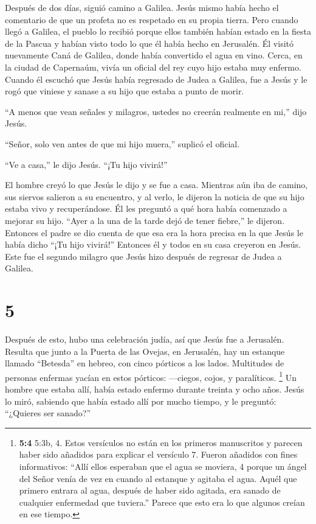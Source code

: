  Después de dos días, siguió camino a Galilea.
 Jesús mismo había hecho el comentario de que un profeta no
es respetado en su propia tierra.  Pero cuando llegó a
Galilea, el pueblo lo recibió porque ellos también habían estado en la
fiesta de la Pascua y habían visto todo lo que él había hecho en
Jerusalén.  Él visitó nuevamente Caná de Galilea, donde
había convertido el agua en vino. Cerca, en la ciudad de Capernaúm,
vivía un oficial del rey cuyo hijo estaba muy enfermo. 
Cuando él escuchó que Jesús había regresado de Judea a Galilea, fue a
Jesús y le rogó que viniese y sanase a su hijo que estaba a punto de
morir.

 ``A menos que vean señales y milagros, ustedes no creerán
realmente en mi,'' dijo Jesús.

 ``Señor, solo ven antes de que mi hijo muera,'' suplicó el
oficial.

 ``Ve a casa,'' le dijo Jesús. ``¡Tu hijo vivirá!''

El hombre creyó lo que Jesús le dijo y se fue a casa. 
Mientras aún iba de camino, sus siervos salieron a su encuentro, y al
verlo, le dijeron la noticia de que su hijo estaba vivo y recuperándose.
 Él les preguntó a qué hora había comenzado a mejorar su
hijo. ``Ayer a la una de la tarde dejó de tener fiebre,'' le dijeron.
 Entonces el padre se dio cuenta de que esa era la hora
precisa en la que Jesús le había dicho ``¡Tu hijo vivirá!'' Entonces él
y todos en su casa creyeron en Jesús.  Este fue el segundo
milagro que Jesús hizo después de regresar de Judea a Galilea.

\hypertarget{section-4}{%
\section{5}\label{section-4}}

 Después de esto, hubo una celebración judía, así que Jesús
fue a Jerusalén.  Resulta que junto a la Puerta de las
Ovejas, en Jerusalén, hay un estanque llamado ``Betesda'' en hebreo, con
cinco pórticos a los lados.  Multitudes de personas enfermas
yacían en estos pórticos: ---ciegos, cojos, y paralíticos. 
\footnote{\textbf{5:4} 5:3b, 4. Estos versículos no están en los
  primeros manuscritos y parecen haber sido añadidos para explicar el
  versículo 7. Fueron añadidos con fines informativos: ``Allí ellos
  esperaban que el agua se moviera, 4 porque un ángel del Señor venía de
  vez en cuando al estanque y agitaba el agua. Aquél que primero entrara
  al agua, después de haber sido agitada, era sanado de cualquier
  enfermedad que tuviera.'' Parece que esto era lo que algunos creían en
  ese tiempo.}  Un hombre que estaba allí, había estado
enfermo durante treinta y ocho años. Jesús lo miró, sabiendo que había
estado allí por mucho tiempo, y le preguntó:  ``¿Quieres ser
sanado?''

